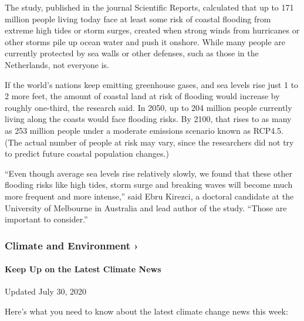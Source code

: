The study, published in the journal Scientific Reports, calculated that
up to 171 million people living today face at least some risk of coastal
flooding from extreme high tides or storm surges, created when strong
winds from hurricanes or other storms pile up ocean water and push it
onshore. While many people are currently protected by sea walls or other
defenses, such as those in the Netherlands, not everyone is.

If the world's nations keep emitting greenhouse gases, and sea levels
rise just 1 to 2 more feet, the amount of coastal land at risk of
flooding would increase by roughly one-third, the research said. In
2050, up to 204 million people currently living along the coasts would
face flooding risks. By 2100, that rises to as many as 253 million
people under a moderate emissions scenario known as RCP4.5. (The actual
number of people at risk may vary, since the researchers did not try to
predict future coastal population changes.)

``Even though average sea levels rise relatively slowly, we found that
these other flooding risks like high tides, storm surge and breaking
waves will become much more frequent and more intense,'' said Ebru
Kirezci, a doctoral candidate at the University of Melbourne in
Australia and lead author of the study. ``Those are important to
consider.''

\href{https://www.nytimes3xbfgragh.onion/section/climate?action=click\&pgtype=Article\&state=default\&region=MAIN_CONTENT_1\&context=storylines_keepup}{}

\hypertarget{climate-and-environment-}{%
\subsubsection{Climate and Environment
›}\label{climate-and-environment-}}

\hypertarget{keep-up-on-the-latest-climate-news}{%
\paragraph{Keep Up on the Latest Climate
News}\label{keep-up-on-the-latest-climate-news}}

Updated July 30, 2020

Here's what you need to know about the latest climate change news this
week:

